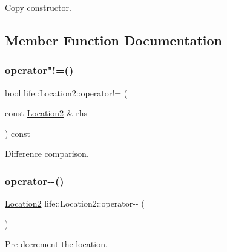 Copy constructor. 



\subsection{Member Function Documentation}
\mbox{\label{structlife_1_1_location2_a0d1d962a97ac56846457d4522b99145b}} 
\subsubsection{\texorpdfstring{operator"!=()}{operator!=()}}
{\footnotesize\ttfamily bool life\+::\+Location2\+::operator!= (\begin{DoxyParamCaption}\item[{const \mbox{\hyperlink{structlife_1_1_location2}{Location2}} \&}]{rhs }\end{DoxyParamCaption}) const\hspace{0.3cm}{\ttfamily [inline]}}



Difference comparison. 

\mbox{\label{structlife_1_1_location2_a99b18978b599ed362f963c7ef93d367d}} 
\subsubsection{\texorpdfstring{operator-\/-\/()}{operator--()}\hspace{0.1cm}{\footnotesize\ttfamily [1/2]}}
{\footnotesize\ttfamily \mbox{\hyperlink{structlife_1_1_location2}{Location2}} life\+::\+Location2\+::operator-\/-\/ (\begin{DoxyParamCaption}{ }\end{DoxyParamCaption})\hspace{0.3cm}{\ttfamily [inline]}}



Pre decrement the location. 

\mbox{\label{structlife_1_1_location2_a76feea4cb55bafbc6ca9ac84f032aea7}} 
